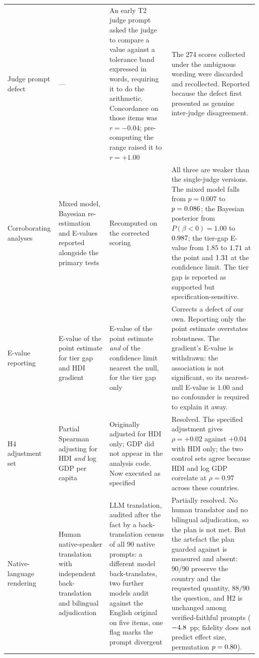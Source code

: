 \documentclass[11pt,a4paper]{article}
\begin{document}
\begin{longtable}{p{3.4cm}p{3.5cm}p{3.5cm}p{3.6cm}}
Judge prompt defect &
--- &
An early T2 judge prompt asked the judge to compare a value against a tolerance
band expressed in words, requiring it to do the arithmetic. Concordance on those
items was $r=-0.04$; pre-computing the range raised it to $r=+1.00$ &
The 274 scores collected under the ambiguous wording were discarded and
recollected. Reported because the defect first presented as genuine inter-judge
disagreement. \\

Corroborating analyses &
Mixed model, Bayesian re-estimation and E-values reported alongside the primary
tests &
Recomputed on the corrected scoring &
All three are weaker than the single-judge versions. The mixed model falls from
$p=0.007$ to $p=0.086$; the Bayesian posterior from $P(\beta<0)=1.00$ to $0.987$;
the tier-gap E-value from $1.85$ to $1.71$ at the point and $1.31$ at the
confidence limit. The tier gap is reported as supported but
specification-sensitive. \\

E-value reporting &
E-value of the point estimate for tier gap and HDI gradient &
E-value of the point estimate \emph{and} of the confidence limit nearest the null,
for the tier gap only &
Corrects a defect of our own. Reporting only the point estimate overstates
robustness. The gradient's E-value is withdrawn: the association is not
significant, so its nearest-null E-value is $1.00$ and no confounder is required
to explain it away. \\

H4 adjustment set &
Partial Spearman adjusting for HDI \emph{and} log GDP per capita &
Originally adjusted for HDI only; GDP did not appear in the analysis code. Now
executed as specified &
Resolved. The specified adjustment gives $\rho=+0.02$ against $+0.04$ with HDI only;
the two control sets agree because HDI and log GDP correlate at $\rho=0.97$
across these countries. \\

Native-language rendering &
Human native-speaker translation with independent back-translation and
bilingual adjudication &
LLM translation, audited after the fact by a back-translation census of all 90
native prompts: a different model back-translates, two further models audit
against the English original on five items, one flag marks the prompt divergent &
Partially resolved. No human translator and no bilingual adjudication, so the
plan is not met. But the artefact the plan guarded against is measured and
absent: $90/90$ preserve the country and the requested quantity, $88/90$ the
question, and H2 is unchanged among verified-faithful prompts ($-4.8$~pp;
fidelity does not predict effect size, permutation $p=0.80$). \\


\end{longtable}
\end{document}
